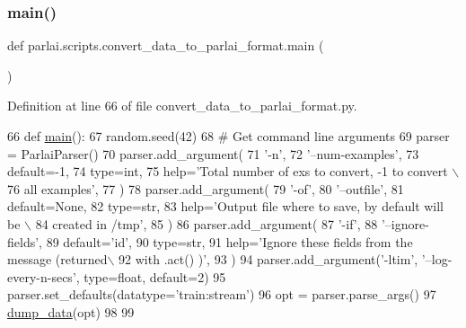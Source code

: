 \mbox{\label{namespaceparlai_1_1scripts_1_1convert__data__to__parlai__format_a1cdf007fb0ed5951c0dfb135500d47cd}} 
\subsubsection{\texorpdfstring{main()}{main()}}
{\footnotesize\ttfamily def parlai.\+scripts.\+convert\+\_\+data\+\_\+to\+\_\+parlai\+\_\+format.\+main (\begin{DoxyParamCaption}{ }\end{DoxyParamCaption})}



Definition at line 66 of file convert\+\_\+data\+\_\+to\+\_\+parlai\+\_\+format.\+py.


\begin{DoxyCode}
66 \textcolor{keyword}{def }\hyperlink{namespaceparlai_1_1scripts_1_1convert__data__to__parlai__format_a1cdf007fb0ed5951c0dfb135500d47cd}{main}():
67     random.seed(42)
68     \textcolor{comment}{# Get command line arguments}
69     parser = ParlaiParser()
70     parser.add\_argument(
71         \textcolor{stringliteral}{'-n'},
72         \textcolor{stringliteral}{'--num-examples'},
73         default=-1,
74         type=int,
75         help=\textcolor{stringliteral}{'Total number of exs to convert, -1 to convert \(\backslash\)}
76 \textcolor{stringliteral}{                                all examples'},
77     )
78     parser.add\_argument(
79         \textcolor{stringliteral}{'-of'},
80         \textcolor{stringliteral}{'--outfile'},
81         default=\textcolor{keywordtype}{None},
82         type=str,
83         help=\textcolor{stringliteral}{'Output file where to save, by default will be \(\backslash\)}
84 \textcolor{stringliteral}{                                created in /tmp'},
85     )
86     parser.add\_argument(
87         \textcolor{stringliteral}{'-if'},
88         \textcolor{stringliteral}{'--ignore-fields'},
89         default=\textcolor{stringliteral}{'id'},
90         type=str,
91         help=\textcolor{stringliteral}{'Ignore these fields from the message (returned\(\backslash\)}
92 \textcolor{stringliteral}{                                with .act() )'},
93     )
94     parser.add\_argument(\textcolor{stringliteral}{'-ltim'}, \textcolor{stringliteral}{'--log-every-n-secs'}, type=float, default=2)
95     parser.set\_defaults(datatype=\textcolor{stringliteral}{'train:stream'})
96     opt = parser.parse\_args()
97     \hyperlink{namespaceparlai_1_1scripts_1_1convert__data__to__parlai__format_a4ed2278a6a86b341d814edbef295124c}{dump\_data}(opt)
98 
99 
\end{DoxyCode}
